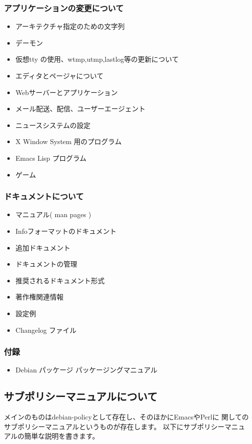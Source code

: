 \documentclass[mingoth,a4paper]{jsarticle}
\begin{document}
    \subsubsection{アプリケーションの変更について}
\begin{itemize}
        \item アーキテクチャ指定のための文字列
        \item デーモン
        \item 仮想tty の使用、wtmp,utmp,lastlog等の更新について
        \item エディタとページャについて
        \item Webサーバーとアプリケーション
        \item メール配送、配信、ユーザーエージェント
        \item ニュースシステムの設定
        \item X Window System 用のプログラム
        \item Emacs Lisp プログラム
        \item ゲーム
\end{itemize}
    \subsubsection{ドキュメントについて}
\begin{itemize}
        \item マニュアル( man pages )
        \item Infoフォーマットのドキュメント
        \item 追加ドキュメント
        \item ドキュメントの管理
        \item 推奨されるドキュメント形式
        \item 著作権関連情報
        \item 設定例
        \item Changelog ファイル
\end{itemize}
    \subsubsection{付録}
\begin{itemize}
        \item Debian パッケージ パッケージングマニュアル
\end{itemize}

\subsection{サブポリシーマニュアルについて}
    メインのものはdebian-policyとして存在し、そのほかにEmacsやPerlに
    関してのサブポリシーマニュアルというものが存在します。
    以下にサブポリシーマニュアルの簡単な説明を書きます。
\end{document}
